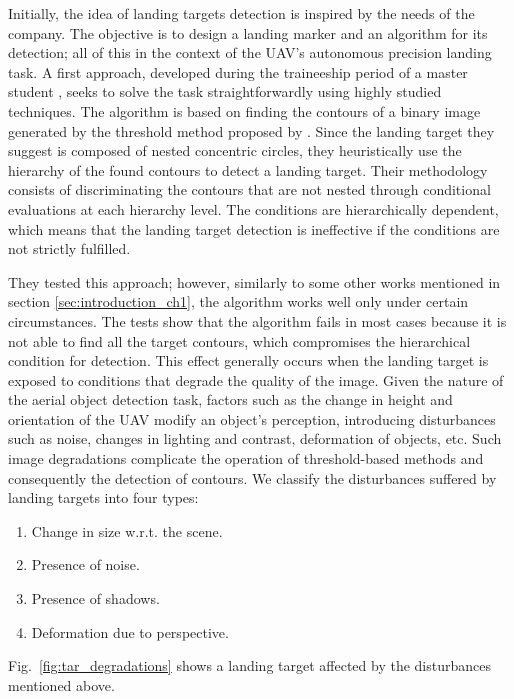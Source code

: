 Initially, the idea of landing targets detection is inspired by the needs of the \cite{Internest:WebPage:} company. The objective is to design a landing marker and an algorithm for its detection; all of this in the context of the UAV's autonomous precision landing task. A first approach, developed during the traineeship period of a master student \citep{BaquedanoA.:ESIEE:2017}, seeks to solve the task straightforwardly using highly studied techniques. The algorithm is based on finding the contours of a binary image generated by the threshold method proposed by \cite{Otsu:SMC:1979}. Since the landing target they suggest is composed of nested concentric circles, they heuristically use the hierarchy of the found contours to detect a landing target. Their methodology consists of discriminating the contours that are not nested through conditional evaluations at each hierarchy level. The conditions are hierarchically dependent, which means that the landing target detection is ineffective if the conditions are not strictly fulfilled.

They tested this approach; however, similarly to some other works mentioned in section \ref{sec:introduction_ch1}, the algorithm works well only under certain circumstances. The tests show that the algorithm fails in most cases because it is not able to find all the target contours, which compromises the hierarchical condition for detection. This effect generally occurs when the landing target is exposed to conditions that degrade the quality of the image. Given the nature of the aerial object detection task, factors such as the change in height and orientation of the UAV modify an object's perception, introducing disturbances such as noise, changes in lighting and contrast, deformation of objects, etc. Such image degradations complicate the operation of threshold-based methods and consequently the detection of contours. We classify the disturbances suffered by landing targets into four types: 

\begin{enumerate}
	\item Change in size w.r.t. the scene.
	\item Presence of noise.
	\item Presence of shadows.
	\item Deformation due to perspective.
\end{enumerate}
Fig.\ \ref{fig:tar_degradations} shows a landing target affected by the disturbances mentioned above.

